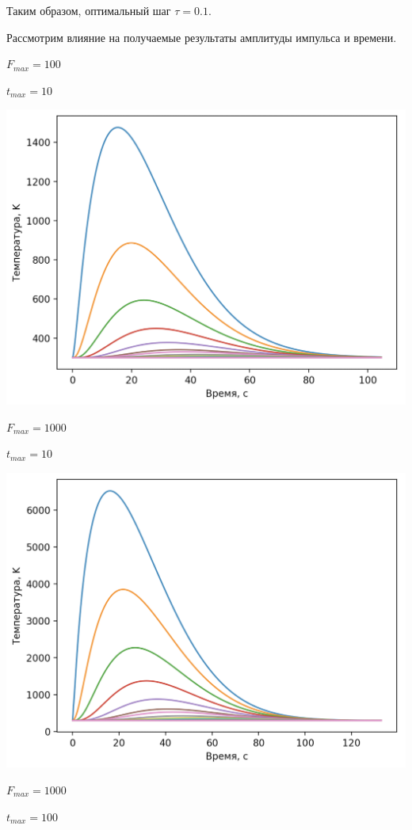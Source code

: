 \documentclass[a4paper,14pt]{extreport} %
\begin{document}
\begin{enumerate}
Таким образом, оптимальный шаг $\tau=0.1$. 

\newpage

Рассмотрим влияние на получаемые результаты амплитуды импульса  и  времени. 

$F_{max}=100$

$t_{max}=10$ 

\includegraphics[scale=0.6]{4}

$F_{max}=1000$

$t_{max}=10$ 

\includegraphics[scale=0.6]{5}

\newpage

$F_{max}=1000$

$t_{max}=100$ 


\end{enumerate}
\end{document}
